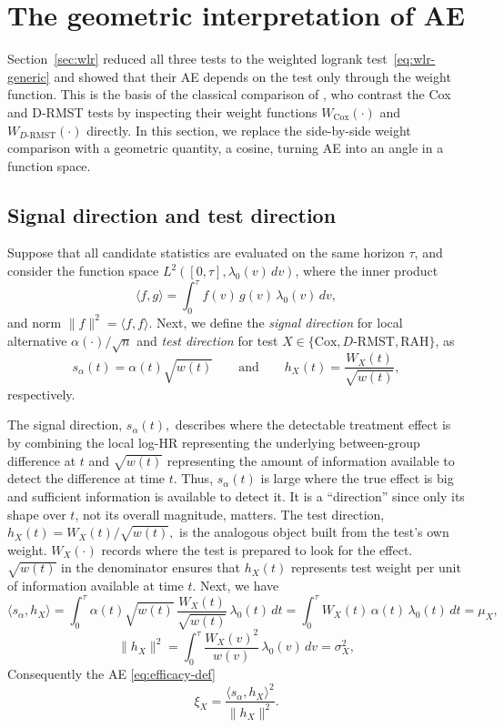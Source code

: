 \documentclass[12pt]{article}
\newcommand{\RAH}{\mathrm{RAH}}
\newcommand{\DRMST}{D\text{-}\mathrm{RMST}}
\newcommand{\dd}{\,d}
\begin{document}
\section{The geometric interpretation of AE}
\label{sec:cosine}
Section~\ref{sec:wlr} reduced all three tests to the weighted logrank test~\eqref{eq:wlr-generic} and showed that their AE depends on the test only through the weight function.  This is the basis
of the classical comparison of \citet{Tian2018}, who contrast the Cox and
D-RMST tests by inspecting their weight functions $W_{\mathrm{Cox}}(\cdot)$ and
$W_{\DRMST}(\cdot)$ directly. In this section, we replace the side-by-side weight comparison with a geometric quantity, a cosine, turning AE into an angle in a function space.


\subsection{Signal direction and test direction}
\label{sec:directions}

Suppose that all candidate statistics are evaluated on the same horizon $\tau$, and consider the function space $L^2([0,\tau], \lambda_0(v)\dd v)$, where the inner product
\begin{equation}\label{eq:inner-product}
  \langle f,g\rangle=\int_0^\tau f(v)\,g(v)\,\lambda_0(v)\dd v,
 \end{equation}
and norm $\|f\|^2=\langle f,f\rangle .$ Next, we
define the \emph{signal direction} for local alternative $\alpha(\cdot)/\sqrt{n}$ and \emph{test direction} for test $X\in\{\mathrm{Cox},\DRMST,\RAH\}$, as
\begin{equation}\label{eq:directions}
  s_\alpha(t)=\alpha(t)\sqrt{w(t)}\qquad \mbox{and} \qquad
  h_X(t)=\frac{W_X(t)}{\sqrt{w(t)}},
\end{equation}
respectively.

The signal direction, $s_\alpha(t),$ describes where the detectable treatment effect is by combining the local log-HR representing the underlying between-group difference at $t$ and $\sqrt{w(t)}$ representing the amount of information available to detect the difference at time $t$.  Thus, $s_\alpha(t)$ is large where the true effect is big and sufficient information is available to detect it. It is a ``direction'' since only its shape over $t$, not its overall magnitude, matters. The test direction, $h_X(t)=W_X(t)/\sqrt{w(t)},$ is the analogous
object built from the test's own weight.  $W_X(\cdot)$ records where the test is
prepared to look for the effect. $\sqrt{w(t)}$ in the denominator ensures that $h_X(t)$ represents test weight per unit of information available at time $t$. Next, we have
\[
  \langle s_\alpha,h_X\rangle
    =\int_0^\tau \alpha(t)\sqrt{w(t)}\,\frac{W_X(t)}{\sqrt{w(t)}}\,
      \lambda_0(t)\dd t
    =\int_0^\tau W_X(t)\,\alpha(t)\,\lambda_0(t)\dd t=\mu_X,
\]
\[
  \|h_X\|^2
    =\int_0^\tau \frac{W_X(v)^2}{w(v)}\,\lambda_0(v)\dd v=\sigma_X^2 ,
\]
Consequently the AE \eqref{eq:efficacy-def}
\begin{equation}\label{eq:eff-inner}
  \xi_X=\frac{\langle s_\alpha,h_X\rangle^2}{\|h_X\|^2}.
\end{equation}
\end{document}
